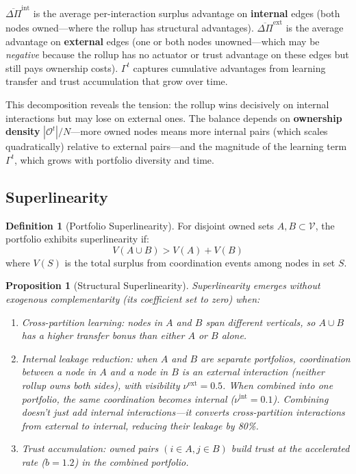 \documentclass[12pt]{article}
\newtheorem{proposition}{Proposition}
\theoremstyle{definition}
\newtheorem{definition}{Definition}
\begin{document}
\noindent $\overline{\Delta\Pi}^{\text{int}}$ is the average per-interaction surplus advantage on \textbf{internal} edges (both nodes owned---where the rollup has structural advantages). $\overline{\Delta\Pi}^{\text{ext}}$ is the average advantage on \textbf{external} edges (one or both nodes unowned---which may be \textit{negative} because the rollup has no actuator or trust advantage on these edges but still pays ownership costs). $\Gamma^t$ captures cumulative advantages from learning transfer and trust accumulation that grow over time.

This decomposition reveals the tension: the rollup wins decisively on internal interactions but may lose on external ones. The balance depends on \textbf{ownership density} $|\mathcal{O}^t|/N$---more owned nodes means more internal pairs (which scales quadratically) relative to external pairs---and the magnitude of the learning term $\Gamma^t$, which grows with portfolio diversity and time.

\subsection{Superlinearity}

\begin{definition}[Portfolio Superlinearity]
For disjoint owned sets $A, B \subset \mathcal{V}$, the portfolio exhibits superlinearity if:
\begin{equation}
V(A \cup B) > V(A) + V(B)
\end{equation}
\noindent where $V(S)$ is the total surplus from coordination events among nodes in set $S$.
\end{definition}

\begin{proposition}[Structural Superlinearity]
\label{prop:super}
Superlinearity emerges without exogenous complementarity (its coefficient set to zero) when:
\begin{enumerate}
\item[(i)] Cross-partition learning: nodes in $A$ and $B$ span different verticals, so $A \cup B$ has a higher transfer bonus than either $A$ or $B$ alone.
\item[(ii)] Internal leakage reduction: when $A$ and $B$ are separate portfolios, coordination between a node in $A$ and a node in $B$ is an \textit{external} interaction (neither rollup owns both sides), with visibility $\nu^{\text{ext}} = 0.5$. When combined into one portfolio, the same coordination becomes \textit{internal} ($\nu^{\text{int}} = 0.1$). Combining doesn't just add internal interactions---it \textit{converts} cross-partition interactions from external to internal, reducing their leakage by 80\%.
\item[(iii)] Trust accumulation: owned pairs $(i \in A, j \in B)$ build trust at the accelerated rate ($b = 1.2$) in the combined portfolio.
\end{enumerate}
\end{proposition}
\end{document}
